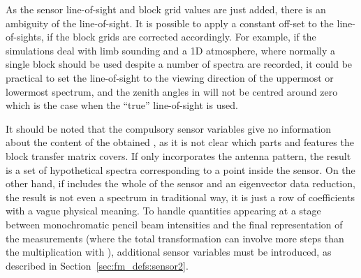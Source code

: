 As the sensor line-of-sight and block grid values are just added,
there is an ambiguity of the line-of-sight. It is possible to apply a
constant off-set to the line-of-sights, if the block grids are
corrected accordingly. For example, if the simulations deal with limb
sounding and a 1D atmosphere, where normally a single block should be
used despite a number of spectra are recorded, it could be practical
to set the line-of-sight to the viewing direction of the uppermost or
lowermost spectrum, and the zenith angles in 
will not be centred around zero which is the case when the ``true''
line-of-sight is used.

It should be noted that the compulsory sensor variables give no
information about the content of the obtained \MsrVct, as it is not
clear which parts and features the block transfer matrix covers. If
 only incorporates the antenna pattern, the result is a set
of hypothetical spectra corresponding to a point inside the sensor. On
the other hand, if  includes the whole of the sensor and an
eigenvector data reduction, the result is not even a spectrum in
traditional way, it is just a row of coefficients with a vague
physical meaning. To handle quantities appearing at a stage between
monochromatic pencil beam intensities and the final representation of
the measurements (where the total transformation can involve more
steps than the multiplication with ), additional sensor
variables must be introduced, as described in
Section~\ref{sec:fm_defs:sensor2}.


\label{sec:fm_defs:rte}



%
%
%
%

